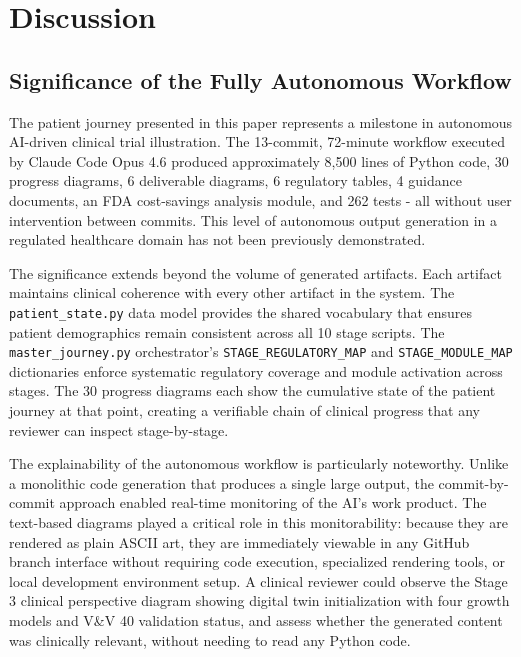 \section{Discussion}
\label{sec:discussion}

\subsection{Significance of the Fully Autonomous Workflow}

The patient journey presented in this paper represents a milestone in autonomous AI-driven clinical trial illustration. The 13-commit, 72-minute workflow executed by Claude Code Opus 4.6 produced approximately 8,500 lines of Python code, 30 progress diagrams, 6 deliverable diagrams, 6 regulatory tables, 4 guidance documents, an FDA cost-savings analysis module, and 262 tests - all without user intervention between commits. This level of autonomous output generation in a regulated healthcare domain has not been previously demonstrated.

The significance extends beyond the volume of generated artifacts. Each artifact maintains clinical coherence with every other artifact in the system. The \texttt{patient\_state.py} data model provides the shared vocabulary that ensures patient demographics remain consistent across all 10 stage scripts. The \texttt{master\_journey.py} orchestrator's \texttt{STAGE\_REGULATORY\_MAP} and \texttt{STAGE\_MODULE\_MAP} dictionaries enforce systematic regulatory coverage and module activation across stages. The 30 progress diagrams each show the cumulative state of the patient journey at that point, creating a verifiable chain of clinical progress that any reviewer can inspect stage-by-stage.

The explainability of the autonomous workflow is particularly noteworthy. Unlike a monolithic code generation that produces a single large output, the commit-by-commit approach enabled real-time monitoring of the AI's work product. The text-based diagrams played a critical role in this monitorability: because they are rendered as plain ASCII art, they are immediately viewable in any GitHub branch interface without requiring code execution, specialized rendering tools, or local development environment setup. A clinical reviewer could observe the Stage 3 clinical perspective diagram showing digital twin initialization with four growth models and V\&V 40 validation status, and assess whether the generated content was clinically relevant, without needing to read any Python code.

